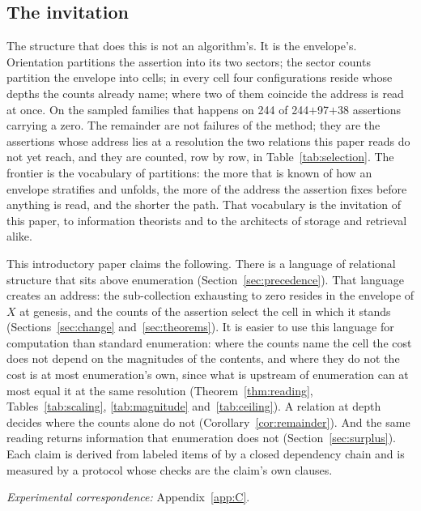 \documentclass[pdflatex,sn-mathphys-num]{sn-jnl}
\theoremstyle{thmstyleone}%
\theoremstyle{thmstyletwo}%
\theoremstyle{thmstylethree}%
\newcommand{\PA}{\cite{Swanagon2026PA}}
\newcommand{\selFirst}{244}\newcommand{\selSecond}{97}\newcommand{\selLater}{38}\newcommand{\selNone}{21}\newcommand{\selTotal}{400}
\begin{document}
\subsection{The invitation}
The structure that does this is not an algorithm's. It is the envelope's. Orientation partitions the assertion into its two sectors; the sector counts partition the envelope into cells; in every cell four configurations reside whose depths the counts already name; where two of them coincide the address is read at once. On the sampled families that happens on \selFirst{} of \selFirst{}$+$\selSecond{}$+$\selLater{} assertions carrying a zero. The remainder are not failures of the method; they are the assertions whose address lies at a resolution the two relations this paper reads do not yet reach, and they are counted, row by row, in Table~\ref{tab:selection}. The frontier is the vocabulary of partitions: the more that is known of how an envelope stratifies and unfolds, the more of the address the assertion fixes before anything is read, and the shorter the path. That vocabulary is the invitation of this paper, to information theorists and to the architects of storage and retrieval alike.

This introductory paper claims the following. There is a language of relational structure that sits above enumeration (Section~\ref{sec:precedence}). That language creates an address: the sub-collection exhausting to zero resides in the envelope of $X$ at genesis, and the counts of the assertion select the cell in which it stands (Sections~\ref{sec:change} and~\ref{sec:theorems}). It is easier to use this language for computation than standard enumeration: where the counts name the cell the cost does not depend on the magnitudes of the contents, and where they do not the cost is at most enumeration's own, since what is upstream of enumeration can at most equal it at the same resolution (Theorem~\ref{thm:reading}, Tables~\ref{tab:scaling}, \ref{tab:magnitude} and~\ref{tab:ceiling}). A relation at depth decides where the counts alone do not (Corollary~\ref{cor:remainder}). And the same reading returns information that enumeration does not (Section~\ref{sec:surplus}). Each claim is derived from labeled items of \PA{} by a closed dependency chain and is measured by a protocol whose checks are the claim's own clauses.

\noindent\emph{Experimental correspondence:} Appendix~\ref{app:C}.

\end{document}
